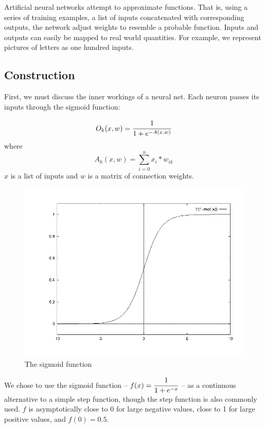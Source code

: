 \documentclass[11pt,a4paper]{article}
\begin{document}
Artificial neural networks attempt to approximate functions. That is, using a series of training examples, a list of inputs concatenated with corresponding outputs, the network adjust weights to resemble a probable function. Inputs and outputs can easily be mapped to real world quantities. For example, we represent pictures of letters as one hundred inputs.

\subsection{Construction}
\label{Artificial Neural Nets:Construction}

First, we must discuss the inner workings of a neural net. Each neuron passes its inputs through the sigmoid function:

\[
O_k(x, w) = \cfrac{1}{1 + e^{-A(x, w)}} 
\]
where 
\[
A_k(x, w) = \sum_{i=0}^n{x_i*w_{ik}}
\]
$x$ is a list of inputs and $w$ is a matrix of connection weights.

\begin{figure}
  \begin{center}
	\includegraphics[scale=.3]{sigmoid.png}
  \end{center}
  \caption{The sigmoid function}
\end{figure}

We chose to use the sigmoid function -- $f(x) = \cfrac{1}{1 + e^{-x}}$ -- as a continuous alternative to a simple step function, though the step function is also commonly used. $f$ is asymptotically close to 0 for large negative values, close to 1 for large positive values, and $f(0) = 0.5$.
\end{document}
